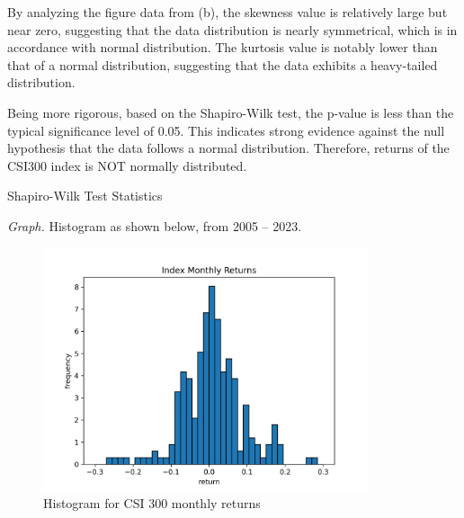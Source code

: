 \noindent
\begin{Question} 

By analyzing the figure data from (b), the skewness value is relatively large but near zero, suggesting that the data distribution is nearly symmetrical, which is in accordance with normal distribution. The kurtosis value is notably lower than that of a normal distribution, suggesting that the data exhibits a heavy-tailed distribution.

Being more rigorous, based on the Shapiro-Wilk test, the p-value is less than the typical significance level of 0.05. This indicates strong evidence against the null hypothesis that the data follows a normal distribution. Therefore, returns of the CSI300 index is NOT normally distributed.


\begin{table}[htbp]
    \centering
    \caption{Shapiro-Wilk Test Statistics}
    \vspace{0.4cm}
\end{table}


\noindent
\textit{Graph.} Histogram as shown below, from 2005 -- 2023.

\begin{figure}[h]
\centering
\vspace{-0.43cm}
\includegraphics[width=0.85\textwidth]{data/q1_graph.png}
\caption{Histogram for CSI 300 monthly returns}
\label{fig:example}
\end{figure}

\end{Question}